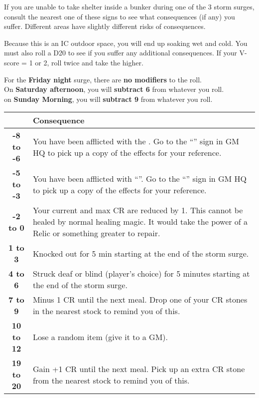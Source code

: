 \documentclass[green]{GL2020}
\begin{document}
\name{\gStormSurgeOutside{}}

If you are unable to take shelter inside a bunker during one of the 3 storm surges, consult the nearest one of these signs to see what consequences (if any) you suffer. Different areas have slightly different risks of consequences.

Because this is an IC outdoor space, you will end up soaking wet and cold. You must also roll a D20 to see if you suffer any additional consequences. If your V-score = 1 or 2, roll twice and take the higher.

{\large For the \textbf{Friday night} surge, there are \textbf{no modifiers} to the roll.}\\
{\large On \textbf{Saturday afternoon}, you will \textbf{subtract 6} from whatever you roll.}\\
{\large on \textbf{Sunday Morning}, you will \textbf{subtract 9} from whatever you roll.}\\

\begin{tabularx}{\textwidth}{|>{\centering\arraybackslash}c | >{\centering\arraybackslash}X |}
\hline
  {\large Your Total} & {\large Consequence}  \\
\hline
 \textbf{-8 to -6} &  You have been afflicted with the \iSlowActingPoison{}. Go to the ``\sStormSurgeConsequences{}'' sign in GM HQ to pick up a copy of the effects for your reference. \\
\hline
 \textbf{-5 to -3} & You have been afflicted with ``\gBadLuckCurse{}''. Go to the ``\sStormSurgeConsequences{}'' sign in GM HQ to pick up a copy of the effects for your reference. \\
\hline
 \textbf{-2 to 0} & Your current and max CR are reduced by 1. This cannot be healed by normal healing magic. It would take the power of a Relic or something greater to repair.  \\
\hline
 \textbf{1 to 3} & Knocked out for 5 min starting at the end of the storm surge.  \\
\hline
  \textbf{4 to 6} & Struck deaf or blind (player’s choice) for 5 minutes starting at the end of the storm surge.  \\
\hline
  \textbf{7 to 9} & Minus 1 CR until the next meal. Drop one of your CR stones in the nearest stock to remind you of this.  \\
\hline
  \textbf{10 to 12} & Lose a random item (give it to a GM).  \\
\hline
 \textbf{19 to 20} & Gain +1 CR until the next meal. Pick up an extra CR stone from the nearest stock to remind you of this.  \\
\hline
\end{tabularx}
\end{document}
